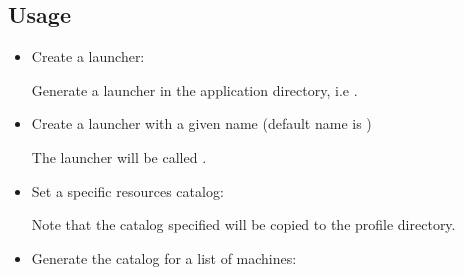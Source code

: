 \documentclass[a4paper,10pt,english]{sphinxmanual}
\begin{document}
\subsection{Usage}
\label{\detokenize{commands/launcher:usage}}\begin{itemize}
\item {} 
Create a launcher:

%
\begin{sphinxVerbatim}[commandchars=\\\{\}]
  
\end{sphinxVerbatim}

Generate a launcher in the application directory, i.e .

\item {} 
Create a launcher with a given name (default name is )

%
\begin{sphinxVerbatim}[commandchars=\\\{\}]
    
\end{sphinxVerbatim}

The launcher will be called .

\item {} 
Set a specific resources catalog:

%
\begin{sphinxVerbatim}[commandchars=\\\{\}]
           
\end{sphinxVerbatim}

Note that the catalog specified will be copied to the profile directory.

\item {} 
Generate the catalog for a list of machines:

%
\begin{sphinxVerbatim}[commandchars=\\\{\}]
      
\end{sphinxVerbatim}


\end{itemize}
\end{document}

